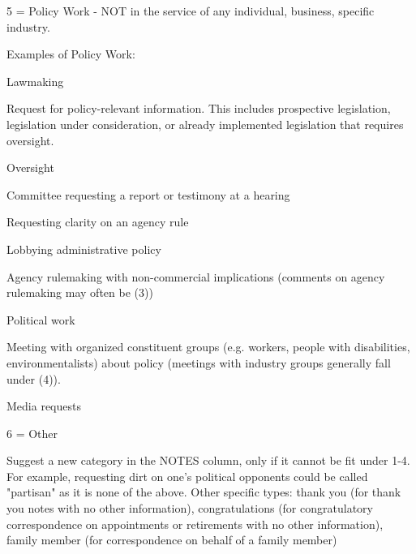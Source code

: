 \documentclass[12pt]{article}
\newenvironment{tight_itemize}{
\begin{itemize}
 \setlength{\itemsep}{0pt}
 \setlength{\parskip}{0pt}
 }{\end{itemize}}
\begin{document}
5 = Policy Work - NOT in the service of any individual, business, specific industry.\\

\hfill\begin{minipage}{\dimexpr\textwidth-2cm}
Examples of Policy Work: 
 \begin{tight_itemize} 
 \item Lawmaking 
\item Request for policy-relevant information. This includes prospective legislation, legislation under consideration, or already implemented legislation that requires oversight.  
\item Oversight
\item Committee requesting a report or testimony at a hearing
\item Requesting clarity on an agency rule
\item Lobbying administrative policy
\item Agency rulemaking with non-commercial implications (comments on agency rulemaking may often be (3)) 
\item Political work
\item Meeting with organized constituent groups (e.g. workers, people with disabilities, environmentalists) about policy (meetings with industry groups generally fall under (4)).
\item Media requests
 \end{tight_itemize} 
\end{minipage}
\bigskip


6 = Other \\

\hfill\begin{minipage}{\dimexpr\textwidth-2cm}
	Suggest a new category in the NOTES column, only if it cannot be fit under 1-4. For example, requesting dirt on one's political opponents could be called "partisan" as it is none of the above. Other specific types: thank you (for thank you notes with no other information), congratulations (for congratulatory correspondence on appointments or retirements with no other information), family member (for correspondence on behalf of a family member) \\
\end{minipage}
\end{document}
